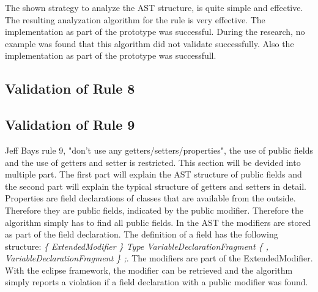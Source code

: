 \label{ast:rule7}

The shown strategy to analyze the \acf{AST} structure, is quite simple and effective. 
\\

The resulting analyzation algorithm for the rule is very effective. The implementation as part of the prototype was successful. During the research, no example was found that this algorithm did not validate successfully. Also the implementation as part of the prototype was successfull. 

\subsection*{Validation of Rule 8}


\subsection*{Validation of Rule 9}
Jeff Bays rule 9, "don't use any getters/setters/properties", the use of public fields and the use of getters and setter is restricted. This section will be devided into multiple part. The first part will explain the AST structure of public fields and the second part will explain the typical structure of getters and setters in detail.
\\

Properties are field declarations of classes that are available from the outside. Therefore they are public fields, indicated by the public modifier. Therefore the algorithm simply has to find all public fields. In the \acf{AST} the modifiers are stored as part of the field declaration. The definition of a field has the following structure: \textit{\{ ExtendedModifier \} Type VariableDeclarationFragment \{ , VariableDeclarationFragment \} ;}. The modifiers are part of the ExtendedModifier. With the eclipse framework, the modifier can be retrieved and the algorithm simply reports a violation if a field declaration with a public modifier was found. 
\\

